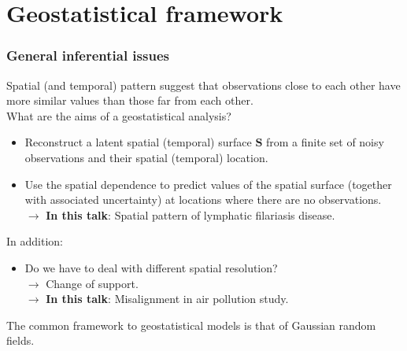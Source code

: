 \documentclass[slidestop,compress,serif,10pt]{beamer}
\begin{document}
\section{Geostatistical framework}
\begin{frame}
\begin{center}
\vfill\fontsize{20}{20}\selectfont{Geostatistical framework}\end{center}
\end{frame}
\begin{frame}\frametitle{General inferential issues}
	Spatial (and temporal) pattern suggest that observations close to each other have more similar
	values than those far from each other.\\

\pause What are the aims of a geostatistical analysis?	
\begin{itemize}
\item Reconstruct a latent spatial (temporal) surface $\bm{S}$ from a finite set of noisy
observations and their spatial (temporal) location.
\item Use the spatial dependence to predict values of the spatial
surface (together with associated uncertainty) at locations where
there are no observations.\\
	$\rightarrow$ {\bf In this talk}: \alert{Spatial pattern of lymphatic filariasis disease}.
\end{itemize}	

\pause\vfill In addition: \begin{itemize}
\vfill\item Do we have to deal with different spatial resolution? \\ $\rightarrow$ Change of support.\\
	$\rightarrow$ {\bf In this talk}: \alert{Misalignment in air pollution study.}\\
\end{itemize}

\pause\vspace{10pt} The common framework to geostatistical models is that of Gaussian
random fields.
\end{frame}
\end{document}
